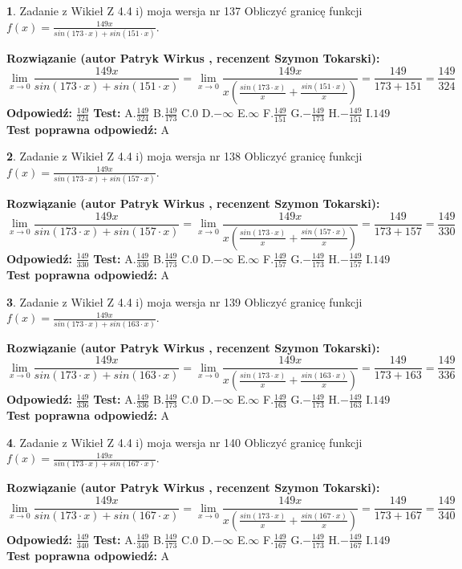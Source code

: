 \documentclass[12pt, a4paper]{article}
\theoremstyle{definition} %
\newtheorem{zad}{}
\newcommand{\zadStart}[1]{\begin{zad}#1\newline}
\newcommand{\zadStop}{\end{zad}}
\newcommand{\rozwStart}[2]{\noindent \textbf{Rozwiązanie (autor #1 , recenzent #2): }\newline}
\newcommand{\rozwStop}{\newline}
\newcommand{\odpStart}{\noindent \textbf{Odpowiedź:}\newline}
\newcommand{\odpStop}{\newline}
\newcommand{\testStart}{\noindent \textbf{Test:}\newline}
\newcommand{\testStop}{\newline}
\newcommand{\kluczStart}{\noindent \textbf{Test poprawna odpowiedź:}\newline}
\newcommand{\kluczStop}{\newline}
\begin{document}
\zadStart{Zadanie z Wikieł Z 4.4 i) moja wersja nr 137}
Obliczyć granicę funkcji $f(x)=\frac{149x}{sin(173\cdot x) +sin(151\cdot x)}$.
\zadStop
\rozwStart{Patryk Wirkus}{Szymon Tokarski}
$$\lim\limits_{x\to 0}\frac{149x}{sin(173\cdot x) +sin(151\cdot x)}=\lim\limits_{x\to 0}\frac{149x}{x(\frac{sin(173\cdot x)}{x}+\frac{sin(151\cdot x)}{x})}=\frac{149}{173+151} = \frac{149}{324}$$
\rozwStop
\odpStart
$\frac{149}{324}$
\odpStop
\testStart
A.$\frac{149}{324}$
B.$\frac{149}{173}$
C.$0$
D.$-\infty$
E.$\infty$
F.$\frac{149}{151}$
G.$-\frac{149}{173}$
H.$-\frac{149}{151}$
I.$149$
\testStop
\kluczStart
A
\kluczStop



\zadStart{Zadanie z Wikieł Z 4.4 i) moja wersja nr 138}
Obliczyć granicę funkcji $f(x)=\frac{149x}{sin(173\cdot x) +sin(157\cdot x)}$.
\zadStop
\rozwStart{Patryk Wirkus}{Szymon Tokarski}
$$\lim\limits_{x\to 0}\frac{149x}{sin(173\cdot x) +sin(157\cdot x)}=\lim\limits_{x\to 0}\frac{149x}{x(\frac{sin(173\cdot x)}{x}+\frac{sin(157\cdot x)}{x})}=\frac{149}{173+157} = \frac{149}{330}$$
\rozwStop
\odpStart
$\frac{149}{330}$
\odpStop
\testStart
A.$\frac{149}{330}$
B.$\frac{149}{173}$
C.$0$
D.$-\infty$
E.$\infty$
F.$\frac{149}{157}$
G.$-\frac{149}{173}$
H.$-\frac{149}{157}$
I.$149$
\testStop
\kluczStart
A
\kluczStop



\zadStart{Zadanie z Wikieł Z 4.4 i) moja wersja nr 139}
Obliczyć granicę funkcji $f(x)=\frac{149x}{sin(173\cdot x) +sin(163\cdot x)}$.
\zadStop
\rozwStart{Patryk Wirkus}{Szymon Tokarski}
$$\lim\limits_{x\to 0}\frac{149x}{sin(173\cdot x) +sin(163\cdot x)}=\lim\limits_{x\to 0}\frac{149x}{x(\frac{sin(173\cdot x)}{x}+\frac{sin(163\cdot x)}{x})}=\frac{149}{173+163} = \frac{149}{336}$$
\rozwStop
\odpStart
$\frac{149}{336}$
\odpStop
\testStart
A.$\frac{149}{336}$
B.$\frac{149}{173}$
C.$0$
D.$-\infty$
E.$\infty$
F.$\frac{149}{163}$
G.$-\frac{149}{173}$
H.$-\frac{149}{163}$
I.$149$
\testStop
\kluczStart
A
\kluczStop



\zadStart{Zadanie z Wikieł Z 4.4 i) moja wersja nr 140}
Obliczyć granicę funkcji $f(x)=\frac{149x}{sin(173\cdot x) +sin(167\cdot x)}$.
\zadStop
\rozwStart{Patryk Wirkus}{Szymon Tokarski}
$$\lim\limits_{x\to 0}\frac{149x}{sin(173\cdot x) +sin(167\cdot x)}=\lim\limits_{x\to 0}\frac{149x}{x(\frac{sin(173\cdot x)}{x}+\frac{sin(167\cdot x)}{x})}=\frac{149}{173+167} = \frac{149}{340}$$
\rozwStop
\odpStart
$\frac{149}{340}$
\odpStop
\testStart
A.$\frac{149}{340}$
B.$\frac{149}{173}$
C.$0$
D.$-\infty$
E.$\infty$
F.$\frac{149}{167}$
G.$-\frac{149}{173}$
H.$-\frac{149}{167}$
I.$149$
\testStop
\kluczStart
A
\kluczStop
\end{document}
